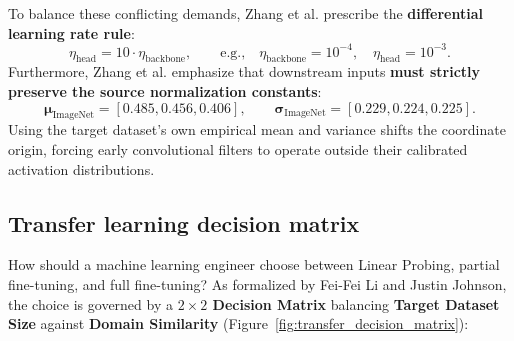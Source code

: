 To balance these conflicting demands, Zhang et al. prescribe the \textbf{differential learning rate rule}:
\begin{equation}
\eta_{\text{head}} = 10 \cdot \eta_{\text{backbone}}, \qquad \text{e.g.,} \quad \eta_{\text{backbone}} = 10^{-4}, \quad \eta_{\text{head}} = 10^{-3}.
\label{eq:differential_lr_rule}
\end{equation}
Furthermore, Zhang et al. emphasize that downstream inputs \textbf{must strictly preserve the source normalization constants}:
\begin{equation}
\boldsymbol{\mu}_{\text{ImageNet}} = [0.485, 0.456, 0.406], \qquad \boldsymbol{\sigma}_{\text{ImageNet}} = [0.229, 0.224, 0.225].
\end{equation}
Using the target dataset's own empirical mean and variance shifts the coordinate origin, forcing early convolutional filters to operate outside their calibrated activation distributions.

\subsection{Transfer learning decision matrix}
\label{sec:transfer_learning_decision_matrix}

How should a machine learning engineer choose between Linear Probing, partial fine-tuning, and full fine-tuning? As formalized by Fei-Fei Li and Justin Johnson, the choice is governed by a \textbf{$2 \times 2$ Decision Matrix} balancing \textbf{Target Dataset Size} against \textbf{Domain Similarity} (Figure~\ref{fig:transfer_decision_matrix}):

